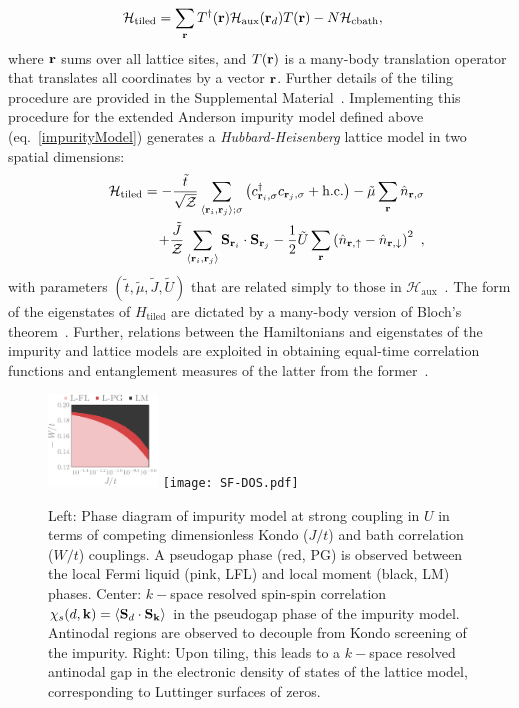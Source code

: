 \documentclass[%
 reprint,
superscriptaddress,
groupedaddress,
 amsmath,amssymb,
 aps,
prl,superscriptaddress
]{revtex4-2}
\begin{document}
\begin{equation}\begin{aligned}
	\label{tilingPrescription}
	\mathcal{H}_\text{tiled} &= \sum_{{\bf r}}T^\dagger({\bf r})\mathcal{H}_\text{aux}({\bf r}_d)T({\bf r}) - N\mathcal{H}_\text{cbath},
\end{aligned}\end{equation}
where \({\bf r}\) sums over all lattice sites, and $T({\bf r})$ is a many-body translation operator that translates all coordinates by a vector \({\bf r}\). Further details of the tiling procedure are provided in the Supplemental Material~\cite{suppmat}. Implementing this procedure for the extended Anderson impurity model defined above (eq.~\ref{impurityModel}) generates a {\it Hubbard-Heisenberg} lattice model in two spatial dimensions:
    \begin{eqnarray}
        &&\mathcal{H}_\text{tiled} = -\frac{\tilde t}{\sqrt\mathcal{Z}}\sum_{\left<{\bf r}_i, {\bf r}_j\right>;\sigma}\left(c^\dagger_{{\bf r}_i,\sigma}c_{{\bf r}_j,\sigma} + \text{h.c.}\right) - \tilde \mu \sum_{{\bf r}}\hat n_{{\bf r},\sigma}\nonumber \\
        &&+ \frac{\tilde J}{\mathcal{Z}}\sum_{\left< {\bf r}_i, {\bf r}_j\right>}{\bf S}_{{\bf r}_i}\cdot{\bf S}_{{\bf r}_j} - \frac{1}{2}\tilde U\sum_{\bf r}\left(\hat n_{{\bf r} , \uparrow} - \hat n_{{\bf r} , \downarrow}\right)^2~,
        \end{eqnarray}
with parameters $(\tilde{t},\tilde{\mu},\tilde{J},\tilde{U})$
that are related simply to those in $\mathcal{H}_\text{aux}$~\cite{suppmat}. The form of the eigenstates of $H_{\text{tiled}}$ are dictated by a many-body version of Bloch's theorem~\cite{stoyanova}. Further, relations between the Hamiltonians and eigenstates of the impurity and lattice models are exploited in obtaining equal-time correlation functions and entanglement measures of the latter from the former~\cite{suppmat}.
\begin{figure}
    \centering
    \includegraphics[width=0.31\linewidth, height=2.45cm]{phaseDiagram.pdf}
    \texttt{[image: SF-DOS.pdf]}
    \caption{Left: Phase diagram of impurity model at strong coupling in $U$ in terms of competing dimensionless Kondo ($J/t$) and bath correlation ($W/t$) couplings. A pseudogap phase (red, PG) is observed between the local Fermi liquid (pink, LFL) and local moment (black, LM) phases. Center: $k-$space resolved spin-spin correlation $\chi_s(d,{\bf k}) = \braket{{\bf S}_d\cdot{\bf S}_{\bf k}}$ in the pseudogap phase of the impurity model. Antinodal regions are observed to decouple from Kondo screening of the impurity. Right: Upon tiling, this leads to a $k-$space resolved antinodal gap in the electronic density of states of the lattice model, corresponding to Luttinger surfaces of zeros.}
    \label{spinCorr}
\end{figure}
\end{document}
